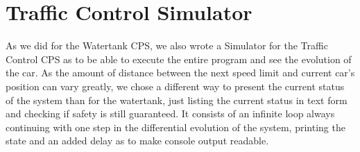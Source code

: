 \section{Traffic Control Simulator}
\label{app:sec:TrafficSim}

As we did for the Watertank CPS, we also wrote a Simulator for the Traffic Control CPS as to be able to execute the entire program and see the evolution of the car. As the amount of distance between the next speed limit and current car's position can vary greatly, we chose a different way to present the current status of the system than for the watertank, just listing the current status in text form and checking if safety is still guaranteed. It consists of an infinite loop always continuing with one step in the differential evolution of the system, printing the state and an added delay as to make console output readable.

